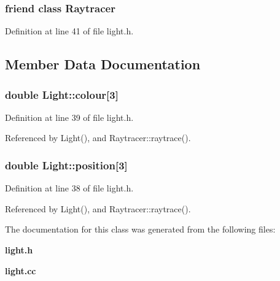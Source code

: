 \subsubsection[{Raytracer}]{\setlength{\rightskip}{0pt plus 5cm}friend class {\bf Raytracer}\hspace{0.3cm}{\ttfamily [friend]}}\label{class_light_abdcaeaebdde8832b52218293829319d1}


Definition at line 41 of file light.\+h.



\subsection{Member Data Documentation}
\subsubsection[{colour}]{\setlength{\rightskip}{0pt plus 5cm}double Light\+::colour[3]\hspace{0.3cm}{\ttfamily [private]}}\label{class_light_afa2b33995ca8745650d9dbc98dbb8710}


Definition at line 39 of file light.\+h.



Referenced by Light(), and Raytracer\+::raytrace().

\subsubsection[{position}]{\setlength{\rightskip}{0pt plus 5cm}double Light\+::position[3]\hspace{0.3cm}{\ttfamily [private]}}\label{class_light_a6fcf74c8199df0c6fdfb10afe0c0fac1}


Definition at line 38 of file light.\+h.



Referenced by Light(), and Raytracer\+::raytrace().



The documentation for this class was generated from the following files\+:\begin{DoxyCompactItemize}
\item 
{\bf light.\+h}\item 
{\bf light.\+cc}\end{DoxyCompactItemize}
